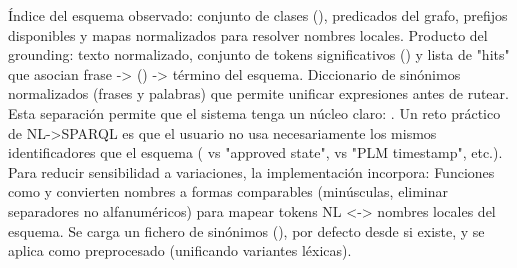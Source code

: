 \markdownRendererUlItem {} Índice del esquema observado: conjunto de clases (), predicados del grafo, prefijos disponibles y mapas normalizados  para resolver nombres locales.\markdownRendererUlItemEnd 
\markdownRendererUlItem {} Producto del grounding: texto normalizado, conjunto de tokens significativos () y lista de "hits" que asocian frase -> () -> término del esquema.\markdownRendererUlItemEnd 
\markdownRendererUlItem {} Diccionario de sinónimos normalizados (frases y palabras) que permite unificar expresiones antes de rutear.\markdownRendererUlItemEnd 
\markdownRendererUlEndTight \markdownRendererInterblockSeparator
{}Esta separación permite que el sistema tenga un núcleo claro: .\markdownRendererInterblockSeparator
{}\markdownRendererInterblockSeparator
{}Un reto práctico de NL->SPARQL es que el usuario no usa necesariamente los mismos identificadores que el esquema ( vs "approved state",  vs "PLM timestamp", etc.). Para reducir sensibilidad a variaciones, la implementación incorpora:\markdownRendererInterblockSeparator
{}\markdownRendererUlBeginTight
\markdownRendererUlItem {} Funciones como  y  convierten nombres a formas comparables (minúsculas, eliminar separadores no alfanuméricos) para mapear tokens NL <-> nombres locales del esquema.\markdownRendererUlItemEnd 
\markdownRendererUlItem {} Se carga un fichero de sinónimos (), por defecto desde  si existe, y se aplica como preprocesado (unificando variantes léxicas).\markdownRendererUlItemEnd 
